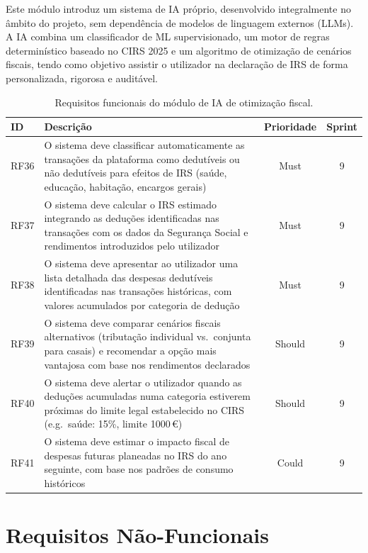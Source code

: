 Este módulo introduz um sistema de \ac{IA} próprio, desenvolvido integralmente no âmbito do projeto, sem dependência de modelos de linguagem externos (\ac{LLM}s). A IA combina um classificador de \ac{ML} supervisionado, um motor de regras determinístico baseado no \ac{CIRS} 2025 e um algoritmo de otimização de cenários fiscais, tendo como objetivo assistir o utilizador na declaração de \ac{IRS} de forma personalizada, rigorosa e auditável.

\begin{table}[H]
\centering
\caption{Requisitos funcionais do módulo de IA de otimização fiscal.}
\label{tab:rf-fiscal-ia}
\small
\begin{tabularx}{\textwidth}{l X c c}
\toprule
\textbf{ID} & \textbf{Descrição} & \textbf{Prioridade} & \textbf{Sprint} \\
\midrule
RF36 & O sistema deve classificar automaticamente as transações da plataforma como dedutíveis ou não dedutíveis para efeitos de \ac{IRS} (saúde, educação, habitação, encargos gerais) & Must & 9 \\
RF37 & O sistema deve calcular o \ac{IRS} estimado integrando as deduções identificadas nas transações com os dados da Segurança Social e rendimentos introduzidos pelo utilizador & Must & 9 \\
RF38 & O sistema deve apresentar ao utilizador uma lista detalhada das despesas dedutíveis identificadas nas transações históricas, com valores acumulados por categoria de dedução & Must & 9 \\
RF39 & O sistema deve comparar cenários fiscais alternativos (tributação individual vs.\ conjunta para casais) e recomendar a opção mais vantajosa com base nos rendimentos declarados & Should & 9 \\
RF40 & O sistema deve alertar o utilizador quando as deduções acumuladas numa categoria estiverem próximas do limite legal estabelecido no \ac{CIRS} (e.g.\ saúde: 15\%, limite 1000\,€) & Should & 9 \\
RF41 & O sistema deve estimar o impacto fiscal de despesas futuras planeadas no \ac{IRS} do ano seguinte, com base nos padrões de consumo históricos & Could & 9 \\
\bottomrule
\end{tabularx}
\end{table}


\section{Requisitos Não-Funcionais}
\label{sec:req-nao-funcionais}

